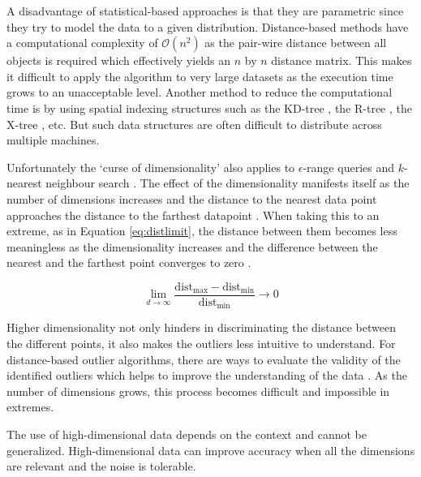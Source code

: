 A disadvantage of statistical-based approaches is that they are parametric since they try to model the data to a given distribution. Distance-based methods have a computational complexity of $\mathcal{O}(n^{2})$ as the pair-wire distance between all objects is required which effectively yields an $n$ by $n$ distance matrix. This makes it difficult to apply the algorithm to very large datasets as the execution time grows to an unacceptable level. Another method to reduce the computational time is by using spatial indexing structures such as the KD-tree \cite{Bentley:1975:MBS:361002.361007}, the R-tree \cite{Guttman:1984:RDI:971697.602266}, the X-tree \cite{Berchtold:1996:XIS:645922.673502}, etc. But such data structures are often difficult to distribute across multiple machines.

Unfortunately the `curse of dimensionality' also applies to $\epsilon$-range queries and $k$-nearest neighbour search \cite{citeulike:12369622}. The effect of the dimensionality manifests itself as the number of dimensions increases and the distance to the nearest data point approaches the distance to the farthest datapoint \cite{Beyer99whenis}. When taking this to an extreme, as in Equation \ref{eq:distlimit}, the distance between them becomes less meaningless as the dimensionality increases and the difference between the nearest and the farthest point converges to zero \cite{meaningnearestneighbour,Hinneburg:2000:NNH:645926.671675,Aggarwal01onthe}.

\begin{equation}
\lim_{d \to \infty} \frac{\text{dist}_{\text{max}} - \text{dist}_{\text{min}}}{\text{dist}_{\text{min}}} \to 0
\label{eq:distlimit}
\end{equation}

Higher dimensionality not only hinders in discriminating the distance between the different points, it also makes the outliers less intuitive to understand. For distance-based outlier algorithms, there are ways to evaluate the validity of the identified outliers which helps to improve the understanding of the data \cite{Knorr:1999:FIK:645925.671529}. As the number of dimensions grows, this process becomes difficult and impossible in extremes.

The use of high-dimensional data depends on the context and cannot be generalized. High-dimensional data can improve accuracy when all the dimensions are relevant and the noise is tolerable.


